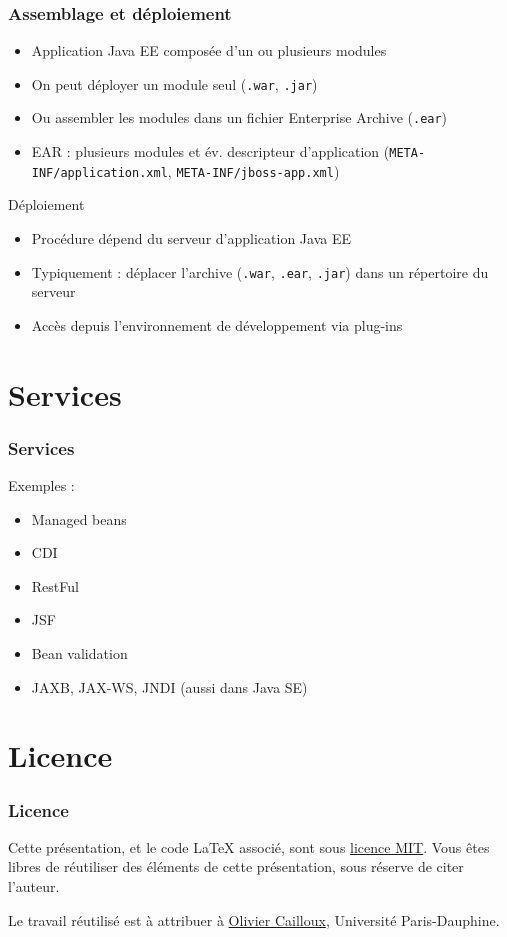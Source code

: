 \documentclass[english, french]{beamer}
\begin{document}
\begin{frame}
	\frametitle{Assemblage et déploiement}
	\begin{itemize}
		\item Application Java EE composée d’un ou plusieurs modules
		\item On peut déployer un module seul (\texttt{.war}, \texttt{.jar})
		\item Ou assembler les modules dans un fichier Enterprise Archive (\texttt{.ear})
		\item EAR : plusieurs modules et év. descripteur d’application (\texttt{META-INF/application.xml}, \texttt{META-INF/jboss-app.xml})
	\end{itemize}
	\begin{block}{Déploiement}
		\begin{itemize}
			\item Procédure dépend du serveur d’application Java EE
			\item Typiquement : déplacer l’archive (\texttt{.war}, \texttt{.ear}, \texttt{.jar}) dans un répertoire du serveur
			\item Accès depuis l’environnement de développement via plug-ins
		\end{itemize}
	\end{block}
\end{frame}

\section{Services}
\begin{frame}
	\frametitle{Services}
	Exemples :
	\begin{itemize}
		\item Managed beans
		\item CDI
		\item RestFul
		\item JSF
		\item Bean validation
		\item JAXB, JAX-WS, JNDI (aussi dans Java SE)
	\end{itemize}
\end{frame}

\appendix
\section{Licence}
\begin{frame}
	\frametitle{Licence}
	Cette présentation, et le code LaTeX associé, sont sous \href{https://opensource.org/licenses/MIT}{licence MIT}. Vous êtes libres de réutiliser des éléments de cette présentation, sous réserve de citer l’auteur.
	
	Le travail réutilisé est à attribuer à \href{http://www.lamsade.dauphine.fr/~ocailloux/}{Olivier Cailloux}, Université Paris-Dauphine.
\end{frame}
\end{document}
